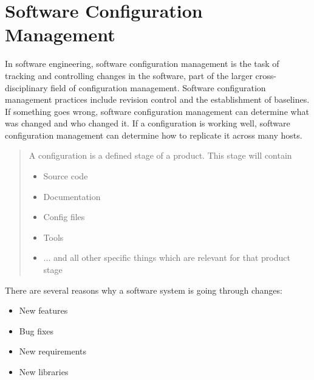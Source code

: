 %
\chapter{Software Configuration Management}
In software engineering, software configuration management is the
task of tracking and controlling changes in the software, part of the
larger cross-disciplinary field of configuration management.
Software configuration management practices include revision control
and the establishment of baselines. If something goes wrong,
software configuration management can determine what was changed and
who changed it. If a configuration is working well, software configuration
management can determine how to replicate it across many hosts.
\begin{quote}
A configuration is a defined stage of a product. This stage will contain
\begin{itemize}
\item Source code
\item Documentation
\item Config files
\item Tools
\item ... and all other specific things which are relevant for that product stage
\end{itemize}
\end{quote}
\newslide
There are several reasons why a software system is going through changes:
\begin{itemize}
\item New features
\item Bug fixes
\item New requirements
\item New libraries
\end{itemize}


